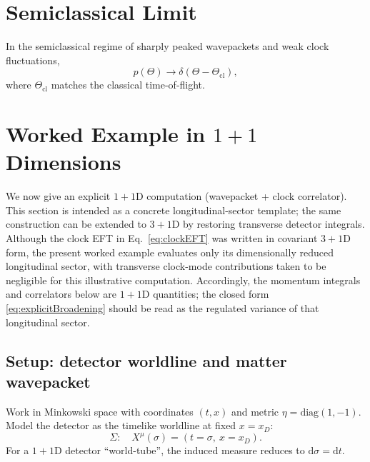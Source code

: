 \documentclass[pdflatex,sn-mathphys-num]{sn-jnl}
\theoremstyle{thmstylethree}
\theoremstyle{thmstyleone}
\theoremstyle{thmstyletwo}
\numberwithin{equation}{section}
\newcommand{\dd}{\mathrm{d}}
\newcommand{\Sig}{\Sigma}
\begin{document}
    \section{Semiclassical Limit}
    
    In the semiclassical regime of sharply peaked wavepackets and weak clock fluctuations,
    \begin{equation}
        p(\Theta)\to \delta(\Theta-\Theta_{\mathrm{cl}}),
    \end{equation}
    where $\Theta_{\mathrm{cl}}$ matches the classical time-of-flight.

    \section{Worked Example in $1+1$ Dimensions}\label{sec:worked-example}
    
    We now give an explicit $1+1$D computation (wavepacket + clock correlator). This section is intended as a concrete longitudinal-sector template; the same construction can be extended to $3+1$D by restoring transverse detector integrals. Although the clock EFT in Eq.~\eqref{eq:clockEFT} was written in covariant $3+1$D form, the present worked example evaluates only its dimensionally reduced longitudinal sector, with transverse clock-mode contributions taken to be negligible for this illustrative computation. Accordingly, the momentum integrals and correlators below are $1+1$D quantities; the closed form \eqref{eq:explicitBroadening} should be read as the regulated variance of that longitudinal sector.
    
    \subsection{Setup: detector worldline and matter wavepacket}
        
        Work in Minkowski space with coordinates $(t,x)$ and metric $\eta=\mathrm{diag}(1,-1)$. Model the detector as the timelike worldline at fixed $x=x_D$:
        \begin{equation}
            \Sig:\quad X^\mu(\sigma)=(t=\sigma,\ x=x_D).
        \end{equation}
        For a $1+1$D detector ``world-tube'', the induced measure reduces to $\dd\sigma=\dd t$.
        
\end{document}
